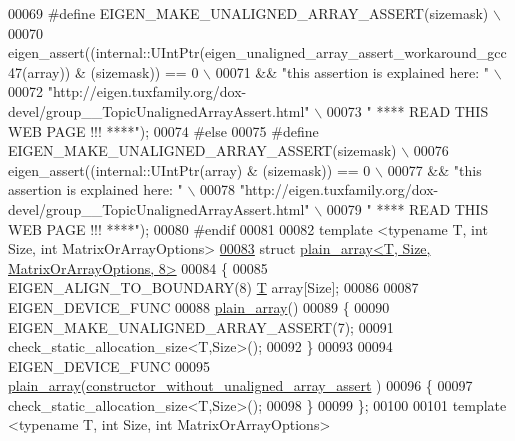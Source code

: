 \begin{DoxyCode}
00069 \textcolor{preprocessor}{  #define EIGEN\_MAKE\_UNALIGNED\_ARRAY\_ASSERT(sizemask) \(\backslash\)}
00070 \textcolor{preprocessor}{    eigen\_assert((internal::UIntPtr(eigen\_unaligned\_array\_assert\_workaround\_gcc47(array)) & (sizemask)) ==
       0 \(\backslash\)}
00071 \textcolor{preprocessor}{              && "this assertion is explained here: " \(\backslash\)}
00072 \textcolor{preprocessor}{              "http://eigen.tuxfamily.org/dox-devel/group\_\_TopicUnalignedArrayAssert.html" \(\backslash\)}
00073 \textcolor{preprocessor}{              " **** READ THIS WEB PAGE !!! ****");}
00074 \textcolor{preprocessor}{#else}
00075 \textcolor{preprocessor}{  #define EIGEN\_MAKE\_UNALIGNED\_ARRAY\_ASSERT(sizemask) \(\backslash\)}
00076 \textcolor{preprocessor}{    eigen\_assert((internal::UIntPtr(array) & (sizemask)) == 0 \(\backslash\)}
00077 \textcolor{preprocessor}{              && "this assertion is explained here: " \(\backslash\)}
00078 \textcolor{preprocessor}{              "http://eigen.tuxfamily.org/dox-devel/group\_\_TopicUnalignedArrayAssert.html" \(\backslash\)}
00079 \textcolor{preprocessor}{              " **** READ THIS WEB PAGE !!! ****");}
00080 \textcolor{preprocessor}{#endif}
00081 
00082 \textcolor{keyword}{template} <\textcolor{keyword}{typename} T, \textcolor{keywordtype}{int} Size, \textcolor{keywordtype}{int} MatrixOrArrayOptions>
\hyperlink{struct_eigen_1_1internal_1_1plain__array_3_01_t_00_01_size_00_01_matrix_or_array_options_00_018_01_4}{00083} \textcolor{keyword}{struct }\hyperlink{struct_eigen_1_1internal_1_1plain__array_3_01_t_00_01_size_00_01_matrix_or_array_options_00_018_01_4}{plain\_array<T, Size, MatrixOrArrayOptions, 8>}
00084 \{
00085   EIGEN\_ALIGN\_TO\_BOUNDARY(8) \hyperlink{group___sparse_core___module}{T} array[Size];
00086 
00087   EIGEN\_DEVICE\_FUNC
00088   \hyperlink{struct_eigen_1_1internal_1_1plain__array}{plain\_array}() 
00089   \{
00090     EIGEN\_MAKE\_UNALIGNED\_ARRAY\_ASSERT(7);
00091     check\_static\_allocation\_size<T,Size>();
00092   \}
00093 
00094   EIGEN\_DEVICE\_FUNC
00095   \hyperlink{struct_eigen_1_1internal_1_1plain__array}{plain\_array}(\hyperlink{struct_eigen_1_1internal_1_1constructor__without__unaligned__array__assert}{constructor\_without\_unaligned\_array\_assert}
      ) 
00096   \{ 
00097     check\_static\_allocation\_size<T,Size>();
00098   \}
00099 \};
00100 
00101 \textcolor{keyword}{template} <\textcolor{keyword}{typename} T, \textcolor{keywordtype}{int} Size, \textcolor{keywordtype}{int} MatrixOrArrayOptions>

\end{DoxyCode}
